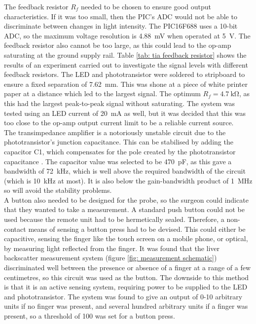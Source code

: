 The feedback resistor $R_f$ needed to be chosen to ensure good output characteristics. If it was too small, then the PIC's ADC would not be able to discriminate between changes in light intensity.  The PIC16F688 uses a 10-bit ADC, so the maximum voltage resolution is \SI{4.88}{\milli\volt} when operated at \SI{5}{\volt}. The feedback resistor also cannot be too large, as this could lead to the op-amp saturating at the ground supply rail. Table \ref{tab: tia feedback resistor} shows the results of an experiment carried out to investigate the signal levels with different feedback resistors. The LED and phototransistor were soldered to stripboard to ensure  a fixed separation of \SI{7.62}{\milli\metre}. This was shone at a piece of white printer paper at a distance which led to the largest signal. The optimum $R_f = \SI{4.7}{\kilo\ohm}$, as this had the largest peak-to-peak signal without saturating. The system was tested using an LED current of \SI{20}{\milli\ampere} as well, but it was decided that this was too close to the op-amp output current limit to be a reliable current source.\\

The transimpedance amplifier is a notoriously unstable circuit due to the phototransistor's junction capacitance. This can be stabilised by adding the capacitor C1, which compensates for the pole created by the phototransistor capacitance \cite{tia_stability}. The capacitor value was selected to be \SI{470}{\pico\farad}, as this gave a bandwidth of \SI{72}{\kilo\hertz}, which is well above the required bandwidth of the circuit (which is \SI{10}{\kilo\hertz} at most). It is also below the gain-bandwidth product of \SI{1}{\mega\hertz} so will avoid the stability problems.\\

A button also needed to be designed for the probe, so the surgeon could indicate that they wanted to take a measurement. A standard push button could not be used because the remote unit had to be hermetically sealed. Therefore, a non-contact means of sensing a button press had to be devised. This could either be capacitive, sensing the finger like the touch screen on a mobile phone, or optical, by measuring light reflected from the finger. It was found that the liver backscatter measurement system (figure \ref{fig: measurement schematic}) discriminated well between the presence or absence of a finger at a range of a few centimetres, so this circuit was used as the button. The downside to this method is that it is an active sensing system, requiring power to be supplied to the LED and phototransistor. The system was found to give an output of 0-10 arbitrary units if no finger was present, and several hundred arbitrary units if a finger was present, so a threshold of 100 was set for a button press. \\


